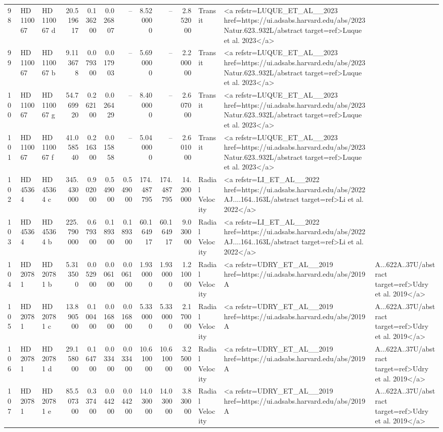 \begin{tabular}{lllrrrrrrrll}
98 & HD 110067 & HD 110067 d & 20.519617 & 0.136200 & 0.026807 & -- & 8.520000 & -- & 2.852000 & Transit & <a refstr=LUQUE_ET_AL__2023 href=https://ui.adsabs.harvard.edu/abs/2023Natur.623..932L/abstract target=ref>Luque et al. 2023</a> \\
99 & HD 110067 & HD 110067 b & 9.113678 & 0.079300 & 0.017903 & -- & 5.690000 & -- & 2.200000 & Transit & <a refstr=LUQUE_ET_AL__2023 href=https://ui.adsabs.harvard.edu/abs/2023Natur.623..932L/abstract target=ref>Luque et al. 2023</a> \\
100 & HD 110067 & HD 110067 g & 54.769920 & 0.262100 & 0.026429 & -- & 8.400000 & -- & 2.607000 & Transit & <a refstr=LUQUE_ET_AL__2023 href=https://ui.adsabs.harvard.edu/abs/2023Natur.623..932L/abstract target=ref>Luque et al. 2023</a> \\
101 & HD 110067 & HD 110067 f & 41.058540 & 0.216300 & 0.015858 & -- & 5.040000 & -- & 2.601000 & Transit & <a refstr=LUQUE_ET_AL__2023 href=https://ui.adsabs.harvard.edu/abs/2023Natur.623..932L/abstract target=ref>Luque et al. 2023</a> \\
102 & HD 45364 & HD 45364 c & 345.430000 & 0.902000 & 0.549000 & 0.549000 & 174.487795 & 174.487795 & 14.200000 & Radial Velocity & <a refstr=LI_ET_AL__2022 href=https://ui.adsabs.harvard.edu/abs/2022AJ....164..163L/abstract target=ref>Li et al. 2022</a> \\
103 & HD 45364 & HD 45364 b & 225.790000 & 0.679300 & 0.189300 & 0.189300 & 60.164917 & 60.164917 & 9.030000 & Radial Velocity & <a refstr=LI_ET_AL__2022 href=https://ui.adsabs.harvard.edu/abs/2022AJ....164..163L/abstract target=ref>Li et al. 2022</a> \\
104 & HD 20781 & HD 20781 b & 5.313500 & 0.052900 & 0.006100 & 0.006100 & 1.930000 & 1.930000 & 1.210000 & Radial Velocity & <a refstr=UDRY_ET_AL__2019 href=https://ui.adsabs.harvard.edu/abs/2019A&A...622A..37U/abstract target=ref>Udry et al. 2019</a> \\
105 & HD 20781 & HD 20781 c & 13.890500 & 0.100400 & 0.016800 & 0.016800 & 5.330000 & 5.330000 & 2.170000 & Radial Velocity & <a refstr=UDRY_ET_AL__2019 href=https://ui.adsabs.harvard.edu/abs/2019A&A...622A..37U/abstract target=ref>Udry et al. 2019</a> \\
106 & HD 20781 & HD 20781 d & 29.158000 & 0.164700 & 0.033400 & 0.033400 & 10.610000 & 10.610000 & 3.250000 & Radial Velocity & <a refstr=UDRY_ET_AL__2019 href=https://ui.adsabs.harvard.edu/abs/2019A&A...622A..37U/abstract target=ref>Udry et al. 2019</a> \\
107 & HD 20781 & HD 20781 e & 85.507300 & 0.337400 & 0.044200 & 0.044200 & 14.030000 & 14.030000 & 3.830000 & Radial Velocity & <a refstr=UDRY_ET_AL__2019 href=https://ui.adsabs.harvard.edu/abs/2019A&A...622A..37U/abstract target=ref>Udry et al. 2019</a> \\

\end{tabular}
